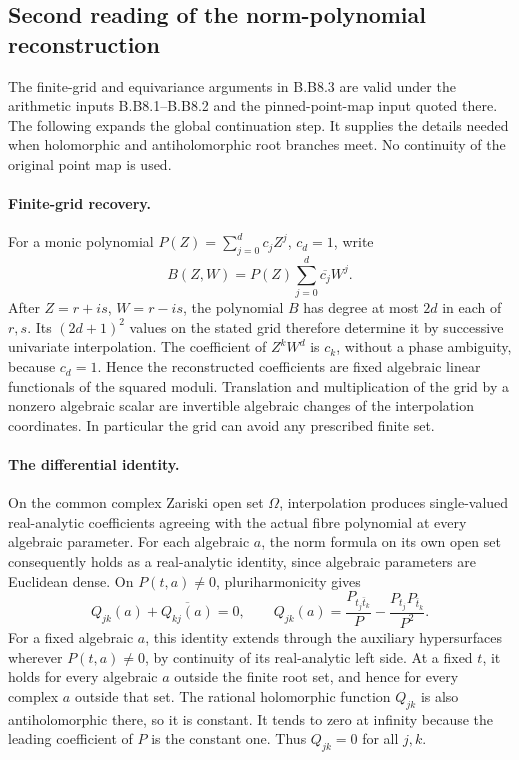 \subsection{Second reading of the norm-polynomial reconstruction}

The finite-grid and equivariance arguments in B.B8.3 are valid under
the arithmetic inputs B.B8.1--B.B8.2 and the pinned-point-map input
quoted there. The following expands the global continuation step.
It supplies the details needed when holomorphic and antiholomorphic
root branches meet. No continuity of the original point map is used.

\paragraph{Finite-grid recovery.}
For a monic polynomial $P(Z)=\sum_{j=0}^d c_jZ^j$, $c_d=1$, write
\[
 B(Z,W)=P(Z)\sum_{j=0}^d\overline{c_j}W^j.
\]
After $Z=r+is$, $W=r-is$, the polynomial $B$ has degree at most
$2d$ in each of $r,s$. Its $(2d+1)^2$ values on the stated grid
therefore determine it by successive univariate interpolation.
The coefficient of $Z^kW^d$ is $c_k$, without a phase ambiguity,
because $c_d=1$. Hence the reconstructed coefficients are fixed
algebraic linear functionals of the squared moduli. Translation
and multiplication of the grid by a nonzero algebraic scalar are
invertible algebraic changes of the interpolation coordinates.
In particular the grid can avoid any prescribed finite set.

\paragraph{The differential identity.}
On the common complex Zariski open set $\Omega$, interpolation
produces single-valued real-analytic coefficients agreeing with the
actual fibre polynomial at every algebraic parameter. For each
algebraic $a$, the norm formula on its own open set consequently
holds as a real-analytic identity, since algebraic parameters are
Euclidean dense. On $P(t,a)\ne0$, pluriharmonicity gives
\[
 Q_{jk}(a)+\overline{Q_{kj}(a)}=0,\qquad
 Q_{jk}(a)=\frac{P_{t_j\bar t_k}}{P}
          -\frac{P_{t_j}P_{\bar t_k}}{P^2}.
\]
For a fixed algebraic $a$, this identity extends through the
auxiliary hypersurfaces wherever $P(t,a)\ne0$, by continuity of
its real-analytic left side. At a fixed $t$, it holds for every
algebraic $a$ outside the finite root set, and hence for every
complex $a$ outside that set. The rational holomorphic function
$Q_{jk}$ is also antiholomorphic there, so it is constant. It tends
to zero at infinity because the leading coefficient of $P$ is the
constant one. Thus $Q_{jk}=0$ for all $j,k$.

